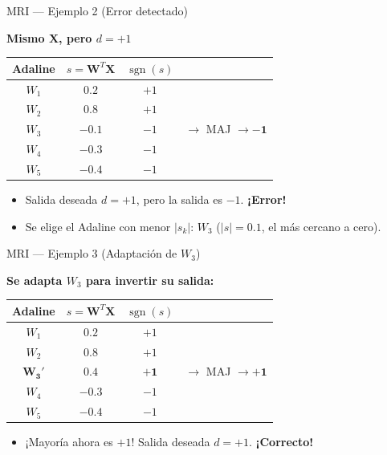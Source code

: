 \documentclass[aspectratio=169,utf8,spanish]{beamer}
\DeclareMathOperator{\sgn}{sgn}
\begin{document}
\begin{frame}{MRI — Ejemplo 2 (Error detectado)}
  \begin{center}
    \textbf{Mismo $\mathbf{X}$, pero $d = +1$}
    \begin{tabular}{c|c|c|c}
      Adaline & $s = \mathbf{W}^T\mathbf{X}$ & $\sgn(s)$ & \\
      \hline
      $W_1$ & $0.2$ & $+1$ & \\
      $W_2$ & $0.8$ & $+1$ & \\
      $W_3$ & $-0.1$ & $-1$ & $\to$ MAJ $\to \mathbf{-1}$ \\
      $W_4$ & $-0.3$ & $-1$ & \\
      $W_5$ & $-0.4$ & $-1$ & \\
    \end{tabular}
  \end{center}
  \begin{itemize}
    \item Salida deseada $d = +1$, pero la salida es $-1$. \textbf{¡Error!}
    \item Se elige el Adaline con menor $|s_k|$: $W_3$ ($|s| = 0.1$, el más cercano a cero).
  \end{itemize}
\end{frame}

\begin{frame}{MRI — Ejemplo 3 (Adaptación de $W_3$)}
  \begin{center}
    \textbf{Se adapta $W_3$ para invertir su salida:}
    \begin{tabular}{c|c|c|c}
      Adaline & $s = \mathbf{W}^T\mathbf{X}$ & $\sgn(s)$ & \\
      \hline
      $W_1$ & $0.2$ & $+1$ & \\
      $W_2$ & $0.8$ & $+1$ & \\
      $\mathbf{W_3'}$ & $\mathbf{0.4}$ & $\mathbf{+1}$ & $\to$ MAJ $\to \mathbf{+1}$ \\
      $W_4$ & $-0.3$ & $-1$ & \\
      $W_5$ & $-0.4$ & $-1$ & \\
    \end{tabular}
  \end{center}
  \begin{itemize}
    \item ¡Mayoría ahora es $+1$! Salida deseada $d = +1$. \textbf{¡Correcto!}
  \end{itemize}
\end{frame}
\end{document}
